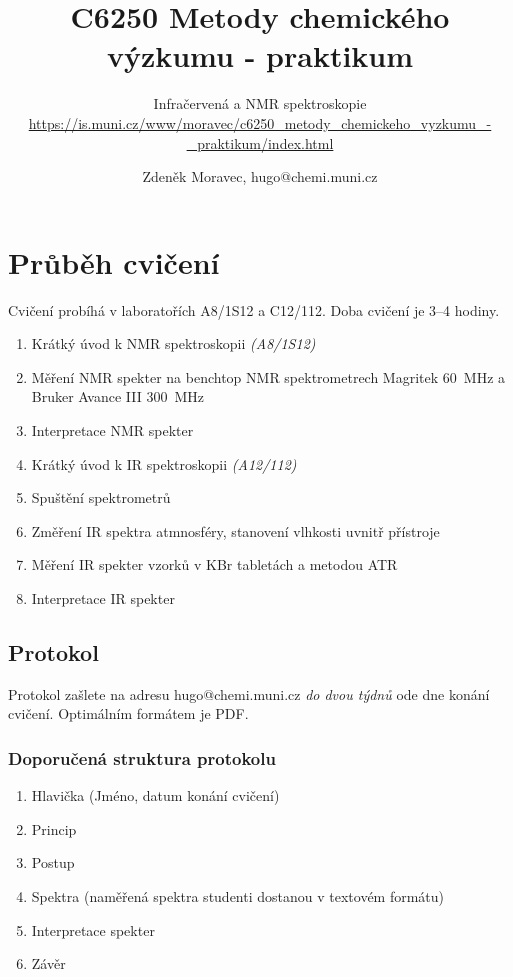 \documentclass[12pt]{article}
\title{C6250 Metody chemického výzkumu - praktikum}
\subtitle{Infračervená a NMR spektroskopie \\ \url{https://is.muni.cz/www/moravec/c6250_metody_chemickeho_vyzkumu_-_praktikum/index.html}}
\author %
{Zdeněk Moravec, hugo@chemi.muni.cz}
\date{}
\begin{document}
\maketitle

\pagebreak

\section{Průběh cvičení}
	Cvičení probíhá v laboratořích A8/1S12 a C12/112. Doba cvičení je 3--4 hodiny.

	\begin{enumerate}
	\item Krátký úvod k NMR spektroskopii \textit{(A8/1S12)}
	\item Měření NMR spekter na benchtop NMR spektrometrech Magritek 60~MHz a Bruker Avance III 300~MHz
	\item Interpretace NMR spekter
	\item Krátký úvod k IR spektroskopii \textit{(A12/112)}
	\item Spuštění spektrometrů
	\item Změření IR spektra atmnosféry, stanovení vlhkosti uvnitř přístroje
	\item Měření IR spekter vzorků v KBr tabletách a metodou ATR
	\item Interpretace IR spekter
	\end{enumerate}

\subsection{Protokol}

Protokol zašlete na adresu hugo@chemi.muni.cz \textit{do dvou týdnů} ode dne konání cvičení. Optimálním formátem je PDF.

\subsubsection{Doporučená struktura protokolu}

	\begin{enumerate}
	\item Hlavička (Jméno, datum konání cvičení)
	\item Princip
	\item Postup
	\item Spektra (naměřená spektra studenti dostanou v textovém formátu)
	\item Interpretace spekter
	\item Závěr
	\end{enumerate}
\end{document}

